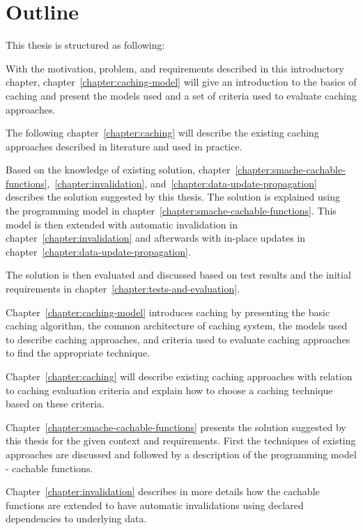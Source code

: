 \section{Outline}
\label{sec:outline}

This thesis is structured as following:

With the motivation, problem, and requirements described in this introductory chapter, chapter~\ref{chapter:caching-model} will give an introduction to the basics of caching and present the models used and a set of criteria used to evaluate caching approaches.

The following chapter~\ref{chapter:caching} will describe the existing caching approaches described in literature and used in practice.

Based on the knowledge of existing solution, chapter~\ref{chapter:smache-cachable-functions},~\ref{chapter:invalidation}, and~\ref{chapter:data-update-propagation} describes the solution suggested by this thesis. The solution is explained using the programming model in chapter~\ref{chapter:smache-cachable-functions}. This model is then extended with automatic invalidation in chapter~\ref{chapter:invalidation} and afterwards with in-place updates in chapter~\ref{chapter:data-update-propagation}.

The solution is then evaluated and discussed based on test results and the initial requirements in chapter~\ref{chapter:tests-and-evaluation}.

Chapter~\ref{chapter:caching-model} introduces caching by presenting the basic caching algorithm, the common architecture of caching system, the models used to describe caching approaches, and criteria used to evaluate caching approaches to find the appropriate technique.

Chapter~\ref{chapter:caching} will describe existing caching approaches with relation to caching evaluation criteria and explain how to choose a caching technique based on these criteria.

Chapter~\ref{chapter:smache-cachable-functions} presents the solution suggested by this thesis for the given context and requirements. First the techniques of existing approaches are discussed and followed by a description of the programming model - cachable functions.

Chapter~\ref{chapter:invalidation} describes in more details how the cachable functions are extended to have automatic invalidations using declared dependencies to underlying data.

